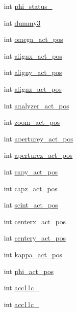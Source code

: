 \begin{DoxyCompactItemize}
int \hyperlink{structmd2StatusStruct_a0e6cea4c32cb34e602b9ac3d21259219}{phi\-\_\-status\-\_}
\item 
int \hyperlink{structmd2StatusStruct_adb2dc5bdbf99def51018558201508009}{dummy3}
\item 
int \hyperlink{structmd2StatusStruct_a6ce303bec89082cae1e9b1fddf6b6c10}{omega\-\_\-act\-\_\-pos}
\item 
int \hyperlink{structmd2StatusStruct_a9653a75bc0b66c5f86d8b0206dc39b4f}{alignx\-\_\-act\-\_\-pos}
\item 
int \hyperlink{structmd2StatusStruct_a0d40a01d2aa93c443526e826440f77fc}{aligny\-\_\-act\-\_\-pos}
\item 
int \hyperlink{structmd2StatusStruct_a480f892fe91b05b2980fb00064807e2b}{alignz\-\_\-act\-\_\-pos}
\item 
int \hyperlink{structmd2StatusStruct_a49d1151b0e819646587be0ca9c9d612a}{analyzer\-\_\-act\-\_\-pos}
\item 
int \hyperlink{structmd2StatusStruct_a920b80e9f5f08aedac3ad541d5ffc8ae}{zoom\-\_\-act\-\_\-pos}
\item 
int \hyperlink{structmd2StatusStruct_a2a434d2b57dbb669de0765486a1516ff}{aperturey\-\_\-act\-\_\-pos}
\item 
int \hyperlink{structmd2StatusStruct_a62d584ce23cfd9aa626d3c03649b455c}{aperturez\-\_\-act\-\_\-pos}
\item 
int \hyperlink{structmd2StatusStruct_ae25122a6db146501b51609b9cb59b044}{capy\-\_\-act\-\_\-pos}
\item 
int \hyperlink{structmd2StatusStruct_a257c04efac3a33d5d34b21d64c6f1266}{capz\-\_\-act\-\_\-pos}
\item 
int \hyperlink{structmd2StatusStruct_a1c146fc792c4285eed5b2c446c214f98}{scint\-\_\-act\-\_\-pos}
\item 
int \hyperlink{structmd2StatusStruct_ae7924b6e91e1de82f6f7910cb3a9c9bd}{centerx\-\_\-act\-\_\-pos}
\item 
int \hyperlink{structmd2StatusStruct_a6be71a92a599d490ca808af8c7e7faa0}{centery\-\_\-act\-\_\-pos}
\item 
int \hyperlink{structmd2StatusStruct_ac384fb7073387dd5dcb2e85a00ec8a77}{kappa\-\_\-act\-\_\-pos}
\item 
int \hyperlink{structmd2StatusStruct_a4de22995a72ff6e72a1a9ccab6d00620}{phi\-\_\-act\-\_\-pos}
\item 
int \hyperlink{structmd2StatusStruct_a69fc2e30a5de0a11c992d133e7a761cd}{acc11c\-\_}
\item 
int \hyperlink{structmd2StatusStruct_ad186f06cb4670b00b8af8264d1da66a4}{acc11c\-\_}

\end{DoxyCompactItemize}
